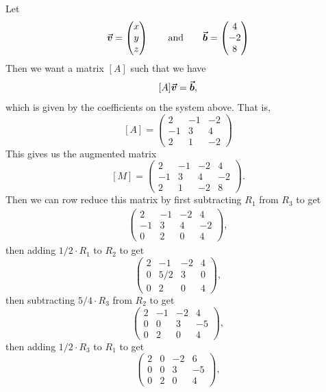\documentclass[12pt]{article} %
\begin{document}
\begin{solution}
Let
\[
\boldsymbol{\vec{v}} = \begin{pmatrix} x \\ y \\ z \end{pmatrix} \qquad \textrm{and} \qquad \boldsymbol{\vec{b}} =\begin{pmatrix} 4 \\ -2 \\ 8\end{pmatrix}
\]
Then we want a matrix $[A]$ such that we have
\[
[A]\boldsymbol{\vec{v}} = \boldsymbol{\vec{b}},
\]
which is given by the coefficients on the system above. That is,
\[
[A]=\begin{pmatrix} 2 & -1 & -2 \\ -1 & 3 & 4 \\ 2 & 1 & -2 \end{pmatrix}
\]
This gives us the augmented matrix
\[
[M] = \left( \begin{array}{ccc|c} 
    2 & -1 & -2 & 4\\
    -1 & 3 & 4 & -2\\
    2 & 1 & -2 & 8
\end{array}\right).
\]
Then we can row reduce this matrix by first subtracting $R_1$ from $R_3$ to get
\begin{align*}
    \left( \begin{array}{ccc|c} 
    2 & -1 & -2 & 4\\
    -1 & 3 & 4 & -2\\
    0 & 2 & 0 & 4
\end{array}\right),
\end{align*}
then adding $1/2\cdot R_1$ to $R_2$ to get
\[
\left( \begin{array}{ccc|c} 
    2 & -1 & -2 & 4\\
    0 & 5/2 & 3 & 0\\
    0 & 2 & 0 & 4
\end{array}\right),
\]
then subtracting $5/4\cdot R_3$ from $R_2$ to get
\[
\left( \begin{array}{ccc|c} 
    2 & -1 & -2 & 4\\
    0 & 0 & 3 & -5\\
    0 & 2 & 0 & 4
\end{array}\right),
\]
then adding $1/2\cdot R_3$ to $R_1$ to get
\[
\left( \begin{array}{ccc|c} 
    2 & 0 & -2 & 6\\
    0 & 0 & 3 & -5\\
    0 & 2 & 0 & 4
\end{array}\right),
\]
\end{solution}
\end{document}
